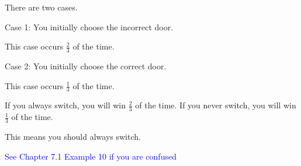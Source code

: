 \documentclass{exam}
\begin{document}
\begin{questions}
\begin{center}
There are two cases.
\vspace{10px}

Case 1: You initially choose the incorrect door.

This case occurs \(\frac{2}{3}\) of the time.
\vspace{10px}

Case 2: You initially choose the correct door.

This case occurs \(\frac{1}{3}\) of the time. 
\vspace{10px}

If you always switch, you will win \(\frac{2}{3}\) of the time. If you never switch, you will win \(\frac{1}{3}\) of the time.

This means you should always switch.

\textcolor{blue}{See Chapter 7.1 Example 10 if you are confused}

\end{center}

\end{questions}
\vspace{5px}
\begin{center} 
\end{center}
\end{document}
